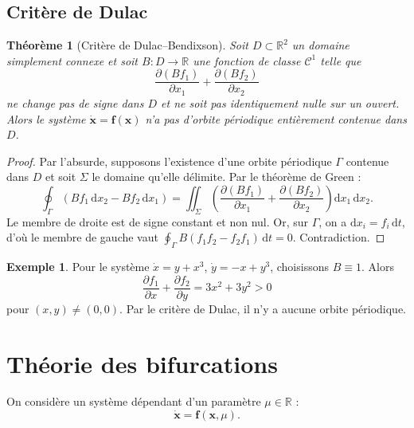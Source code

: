 \documentclass[12pt,a4paper,openany]{book}
\theoremstyle{definition}
\newtheorem{exemple}[definition]{Exemple}
\theoremstyle{plain}
\newtheorem{theoreme}[definition]{Théorème}
\theoremstyle{remark}
\newcommand{\R}{\mathbb{R}}
\newcommand{\dd}{\mathrm{d}}
\begin{document}
\subsection{Critère de Dulac}
\label{subsec:dulac}

\begin{theoreme}[Critère de Dulac--Bendixson]
\label{thm:dulac}
Soit $D \subset \R^2$ un domaine simplement connexe et soit
$B : D \to \R$ une fonction de classe $\mathcal{C}^1$ telle que
\[
\frac{\partial(Bf_1)}{\partial x_1}
+ \frac{\partial(Bf_2)}{\partial x_2}
\]
ne change pas de signe dans $D$ et ne soit pas identiquement nulle
sur un ouvert. Alors le système $\dot{\mathbf{x}} = \mathbf{f}(\mathbf{x})$
n'a pas d'orbite périodique entièrement contenue dans $D$.
\end{theoreme}

\begin{proof}
Par l'absurde, supposons l'existence d'une orbite périodique
$\Gamma$ contenue dans $D$ et soit $\Sigma$ le domaine qu'elle
délimite. Par le théorème de Green :
\[
\oint_\Gamma (Bf_1\, \dd x_2 - Bf_2\, \dd x_1)
= \iint_\Sigma \left(
  \frac{\partial(Bf_1)}{\partial x_1}
  + \frac{\partial(Bf_2)}{\partial x_2}
\right) \dd x_1\, \dd x_2.
\]
Le membre de droite est de signe constant et non nul. Or, sur
$\Gamma$, on a $\dd x_i = f_i\, \dd t$, d'où le membre de gauche
vaut $\oint_\Gamma B(f_1 f_2 - f_2 f_1)\, \dd t = 0$. Contradiction.
\end{proof}

\begin{exemple}
\label{ex:dulac-application}
Pour le système $\dot{x} = y + x^3$, $\dot{y} = -x + y^3$,
choisissons $B \equiv 1$. Alors
\[
\frac{\partial f_1}{\partial x} + \frac{\partial f_2}{\partial y}
= 3x^2 + 3y^2 > 0
\]
pour $(x,y) \neq (0,0)$. Par le critère de Dulac, il n'y a aucune
orbite périodique.
\end{exemple}

\section{Théorie des bifurcations}
\label{sec:bifurcations}

On considère un système dépendant d'un paramètre $\mu \in \R$ :
\begin{equation}
\label{eq:syst-param}
\dot{\mathbf{x}} = \mathbf{f}(\mathbf{x}, \mu).
\end{equation}
\end{document}
